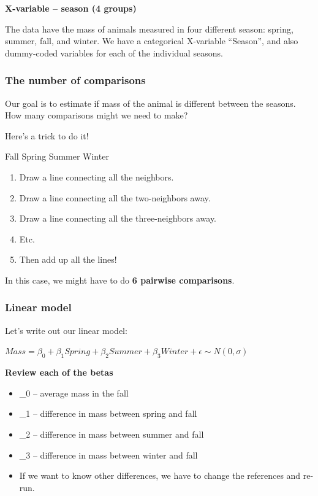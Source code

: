 \documentclass[
]{article}
\providecommand{\tightlist}{%
  \setlength{\itemsep}{0pt}\setlength{\parskip}{0pt}}
\begin{document}
\textbf{X-variable -- season (4 groups)}

The data have the mass of animals measured in four different season:
spring, summer, fall, and winter. We have a categorical X-variable
``Season'', and also dummy-coded variables for each of the individual
seasons.

\subsubsection{The number of
comparisons}\label{the-number-of-comparisons}

Our goal is to estimate if mass of the animal is different between the
seasons. How many comparisons might we need to make?

Here's a trick to do it!

Fall Spring Summer Winter

\begin{enumerate}
\def\labelenumi{\arabic{enumi})}
\tightlist
\item
  Draw a line connecting all the neighbors.
\item
  Draw a line connecting all the two-neighbors away.
\item
  Draw a line connecting all the three-neighbors away.
\item
  Etc.
\item
  Then add up all the lines!
\end{enumerate}

In this case, we might have to do \textbf{6 pairwise comparisons}.

\subsubsection{Linear model}\label{linear-model}

Let's write out our linear model:

\textbf{\(Mass = \beta_0 + \beta_1 Spring + \beta_2 Summer + \beta_3 Winter + \epsilon \sim N(0, \sigma)\)}

\textbf{Review each of the betas}

\begin{itemize}
\tightlist
\item
  \beta\_0 -- average mass in the fall
\item
  \beta\_1 -- difference in mass between spring and fall
\item
  \beta\_2 -- difference in mass between summer and fall
\item
  \beta\_3 -- difference in mass between winter and fall
\item
  If we want to know other differences, we have to change the references
  and re-run.
\end{itemize}
\end{document}

